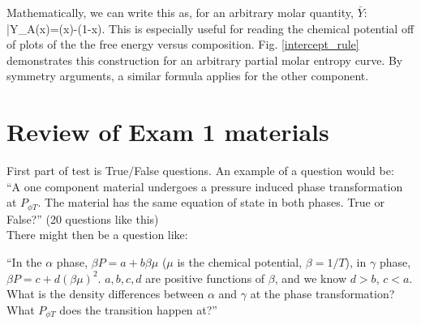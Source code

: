 \documentclass[12pt]{article}
\begin{document}
Mathematically, we can write this as, for an arbitrary molar quantity, \(\bar{Y}\):
\eqs \bar{Y}_A(x)=(x)-(1-x).\eqe
This is especially useful for reading the chemical potential off of plots of the the free energy versus composition. Fig. \ref{intercept_rule} demonstrates this construction for an arbitrary partial molar entropy curve. By symmetry arguments, a similar formula applies for the other component.

%
%
%
\section{Review of Exam 1 materials}
First part of test is True/False questions.  An example of a question would be:\\

``A one component material undergoes a pressure induced phase transformation at $P_{\phi T}$.  The material has the same equation of state in both phases.  True or False?'' (20 questions like this)\\

There might then be a question like:

``In the $\alpha$ phase, $\beta P = a + b \beta \mu$ ($\mu$ is the chemical potential, $\beta = 1/T$), in $\gamma$ phase, $\beta P = c + d (\beta \mu)^2$.  $a,b,c,d$ are positive functions of $\beta$, and we know $d > b$, $c < a$.  What is the density differences between $\alpha$ and $\gamma$ at the phase transformation?  What $P_{\phi T}$ does the transition happen at?''
\end{document}
